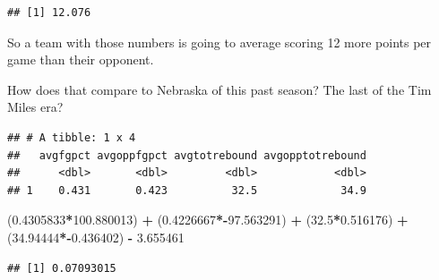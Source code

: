 \documentclass[
]{book}
\newenvironment{Shaded}{\begin{snugshade}}{\end{snugshade}}
\newcommand{\DataTypeTok}[1]{\textcolor[rgb]{0.13,0.29,0.53}{#1}}
\newcommand{\FloatTok}[1]{\textcolor[rgb]{0.00,0.00,0.81}{#1}}
\newcommand{\KeywordTok}[1]{\textcolor[rgb]{0.13,0.29,0.53}{\textbf{#1}}}
\newcommand{\NormalTok}[1]{#1}
\newcommand{\OperatorTok}[1]{\textcolor[rgb]{0.81,0.36,0.00}{\textbf{#1}}}
\newcommand{\StringTok}[1]{\textcolor[rgb]{0.31,0.60,0.02}{#1}}
\begin{document}
\begin{verbatim}
## [1] 12.076
\end{verbatim}

So a team with those numbers is going to average scoring 12 more points per game than their opponent.

How does that compare to Nebraska of this past season? The last of the Tim Miles era?

\begin{Shaded}
\end{Shaded}

\begin{verbatim}
## # A tibble: 1 x 4
##   avgfgpct avgoppfgpct avgtotrebound avgopptotrebound
##      <dbl>       <dbl>         <dbl>            <dbl>
## 1    0.431       0.423          32.5             34.9
\end{verbatim}

\begin{Shaded}
\begin{Highlighting}[]
\NormalTok{(}\FloatTok{0.4305833}\OperatorTok{*}\FloatTok{100.880013}\NormalTok{) }\OperatorTok{+}\StringTok{ }\NormalTok{(}\FloatTok{0.4226667}\OperatorTok{*-}\FloatTok{97.563291}\NormalTok{) }\OperatorTok{+}\StringTok{ }\NormalTok{(}\FloatTok{32.5}\OperatorTok{*}\FloatTok{0.516176}\NormalTok{) }\OperatorTok{+}\StringTok{ }\NormalTok{(}\FloatTok{34.94444}\OperatorTok{*-}\FloatTok{0.436402}\NormalTok{) }\OperatorTok{-}\StringTok{ }\FloatTok{3.655461}
\end{Highlighting}
\end{Shaded}

\begin{verbatim}
## [1] 0.07093015
\end{verbatim}
\end{document}
